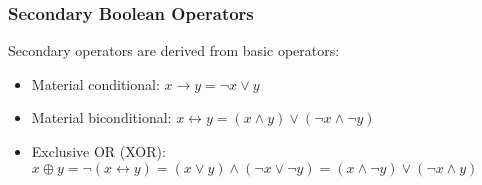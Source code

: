         \subsubsection*{Secondary Boolean Operators}
        \begin{definition}
            Secondary operators are derived from basic operators:
            \begin{itemize}
                \item Material conditional: \( x \rightarrow y = \lnot x \lor y \)
                \item Material biconditional: \( x \leftrightarrow y = (x \land y) \lor (\lnot x \land \lnot y) \)
                \item Exclusive OR (XOR): \( x \oplus y = \lnot(x \leftrightarrow y) = (x \lor y) \land (\lnot x \lor \lnot y) = (x \land \lnot y) \lor (\lnot x \land y) \)
                \end{itemize}
        \end{definition}

